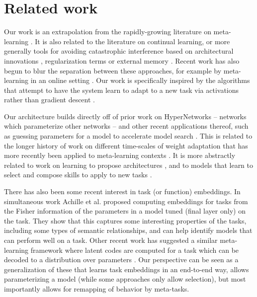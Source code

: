 \documentclass{article}
\begin{document}
\section{Related work}
Our work is an extrapolation from the rapidly-growing literature on meta-learning \citep[e.g.][]{Vinyals2016, Santoro2016, Finn2017a, Finn2018, Stadie2018}. It is also related to the literature on continual learning, or more generally tools for avoiding catastrophic interference based on architectural innovations \citep[e.g.][]{Fernando2017, Rusu2016}, regularization terms \citep[e.g.][]{Kirkpatrick2016, Zenke2017} or external memory \citep[e.g.][]{Sprechmann2018}. Recent work has also begun to blur the separation between these approaches, for example by meta-learning in an online setting \citep{Finn2019}. Our work is specifically inspired by the algorithms that attempt to have the system learn to adapt to a new task via activations rather than gradient descent \citep[e.g.][]{Wang2016a, Duan2016}. \par
Our architecture builds directly off of prior work on HyperNetworks \citep{Ha2016} -- networks which parameterize other networks -- and other recent applications thereof, such as guessing parameters for a model to accelerate model search \citep[e.g.][]{Brock2018a}. This is related to the longer history of work on different time-scales of weight adaptation \citep{Hinton1982} that has more recently been applied to meta-learning contexts \citep[e.g.][]{Ba2016, Munkhdalai2017}. It is more abstractly related to work on learning to propose architectures \citep[e.g.][]{Zoph2016}, and to models that learn to select and compose skills to apply to new tasks \citep[e.g.][]{Andreas, Andreas2016, Tessler2016, Reed2015}. \par 
There has also been some recent interest in task (or function) embeddings. In simultaneous work Achille et al. \citep{Achille2019} proposed computing embeddings for tasks from the Fisher information of the parameters in a model tuned (final layer only) on the task. They show that this captures some interesting properties of the tasks, including some types of semantic relationships, and can help identify models that can perform well on a task. Other recent work has suggested a similar meta-learning framework where latent codes are computed for a task which can be decoded to a distribution over parameters \citep{Rusu2019}. Our perspective can be seen as a generalization of these that learns task embeddings in an end-to-end way, allows parameterizing a model (while some approaches only allow selection), but most importantly allows for remapping of behavior by meta-tasks. \par
\end{document}
